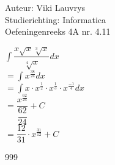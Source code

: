 \documentclass[a4paper]{article}
\begin{document}
  
\noindent \large Auteur: Viki	Lauvrys \\
\noindent \large Studierichting: Informatica\\
\noindent \large Oefeningenreeks 4A nr. 4.11\\

\medskip

\normalsize

$\displaystyle\int \dfrac{x \sqrt{x} \sqrt[3]{x}}{\sqrt[4]{x}} dx $ \\

$ = \displaystyle\int x^{\tfrac{38}{24}} dx $ \\

$ = \displaystyle\int x \cdot x^{\tfrac{1}{2}} \cdot x^{\tfrac{1}{3}} \cdot x^{\tfrac{-1}{4}} dx $ \\

$ = \dfrac{x^{\tfrac{62}{24}}}{\dfrac{62}{24}} + C $ \\ 

$ = \dfrac{12}{31} \cdot x^{\tfrac{31}{12}} + C $ \\ 



\begin{thebibliography}{999}
\end{thebibliography}
\end{document}
